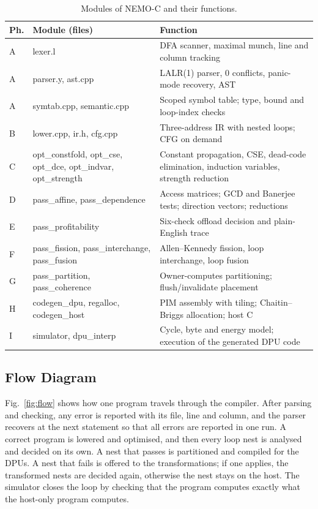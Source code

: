 \documentclass{ieeeaccess}
\begin{document}
\begin{table}[!t]
\caption{Modules of NEMO-C and their functions.}
\label{tab:modules}
\setlength{\tabcolsep}{3pt}
\renewcommand{\arraystretch}{1.1}
\centering
\begin{tabular}{|p{0.5cm}|p{2.6cm}|p{4.7cm}|}
\hline
\textbf{Ph.} & \textbf{Module (files)} & \textbf{Function} \\ \hline
A & lexer.l & DFA scanner, maximal munch, line and column tracking \\ \hline
A & parser.y, ast.cpp & LALR(1) parser, 0 conflicts, panic-mode recovery, AST \\ \hline
A & symtab.cpp, semantic.cpp & Scoped symbol table; type, bound and loop-index checks \\ \hline
B & lower.cpp, ir.h, cfg.cpp & Three-address IR with nested loops; CFG on demand \\ \hline
C & opt\_constfold, opt\_cse, opt\_dce, opt\_indvar, opt\_strength & Constant propagation, CSE, dead-code elimination, induction variables, strength reduction \\ \hline
D & pass\_affine, pass\_dependence & Access matrices; GCD and Banerjee tests; direction vectors; reductions \\ \hline
E & pass\_profitability & Six-check offload decision and plain-English trace \\ \hline
F & pass\_fission, pass\_interchange, pass\_fusion & Allen--Kennedy fission, loop interchange, loop fusion \\ \hline
G & pass\_partition, pass\_coherence & Owner-computes partitioning; flush/invalidate placement \\ \hline
H & codegen\_dpu, regalloc, codegen\_host & PIM assembly with tiling; Chaitin--Briggs allocation; host C \\ \hline
I & simulator, dpu\_interp & Cycle, byte and energy model; execution of the generated DPU code \\ \hline
\end{tabular}
\end{table}

\subsection{Flow Diagram}
\label{sec:flow}

Fig.~\ref{fig:flow} shows how one program travels through the compiler. After parsing and checking, any error is reported with its file, line and column, and the parser recovers at the next statement so that all errors are reported in one run. A correct program is lowered and optimised, and then every loop nest is analysed and decided on its own. A nest that passes is partitioned and compiled for the DPUs. A nest that fails is offered to the transformations; if one applies, the transformed nests are decided again, otherwise the nest stays on the host. The simulator closes the loop by checking that the program computes exactly what the host-only program computes.
\end{document}
